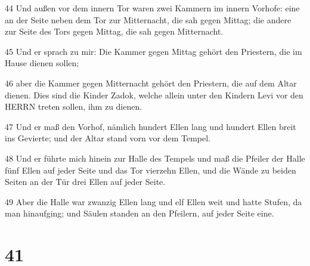 \par 44 Und außen vor dem innern Tor waren zwei Kammern im innern Vorhofe: eine an der Seite neben dem Tor zur Mitternacht, die sah gegen Mittag; die andere zur Seite des Tors gegen Mittag, die sah gegen Mitternacht.
\par 45 Und er sprach zu mir: Die Kammer gegen Mittag gehört den Priestern, die im Hause dienen sollen;
\par 46 aber die Kammer gegen Mitternacht gehört den Priestern, die auf dem Altar dienen. Dies sind die Kinder Zadok, welche allein unter den Kindern Levi vor den HERRN treten sollen, ihm zu dienen.
\par 47 Und er maß den Vorhof, nämlich hundert Ellen lang und hundert Ellen breit ins Gevierte; und der Altar stand vorn vor dem Tempel.
\par 48 Und er führte mich hinein zur Halle des Tempels und maß die Pfeiler der Halle fünf Ellen auf jeder Seite und das Tor vierzehn Ellen, und die Wände zu beiden Seiten an der Tür drei Ellen auf jeder Seite.
\par 49 Aber die Halle war zwanzig Ellen lang und elf Ellen weit und hatte Stufen, da man hinaufging; und Säulen standen an den Pfeilern, auf jeder Seite eine.

\chapter{41}

